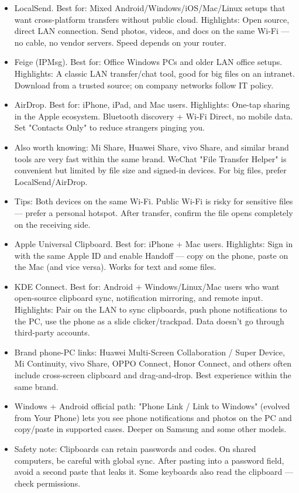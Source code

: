 
\begin{itemize}
  \item LocalSend. Best for: Mixed Android/Windows/iOS/Mac/Linux setups that want cross-platform transfers without public cloud. Highlights: Open source, direct LAN connection. Send photos, videos, and docs on the same Wi-Fi — no cable, no vendor servers. Speed depends on your router.
  \item Feige (IPMsg). Best for: Office Windows PCs and older LAN office setups. Highlights: A classic LAN transfer/chat tool, good for big files on an intranet. Download from a trusted source; on company networks follow IT policy.
  \item AirDrop. Best for: iPhone, iPad, and Mac users. Highlights: One-tap sharing in the Apple ecosystem. Bluetooth discovery + Wi-Fi Direct, no mobile data. Set "Contacts Only" to reduce strangers pinging you.
  \item Also worth knowing: Mi Share, Huawei Share, vivo Share, and similar brand tools are very fast within the same brand. WeChat "File Transfer Helper" is convenient but limited by file size and signed-in devices. For big files, prefer LocalSend/AirDrop.
  \item Tips: Both devices on the same Wi-Fi. Public Wi-Fi is risky for sensitive files — prefer a personal hotspot. After transfer, confirm the file opens completely on the receiving side.
\end{itemize}


\begin{itemize}
  \item Apple Universal Clipboard. Best for: iPhone + Mac users. Highlights: Sign in with the same Apple ID and enable Handoff — copy on the phone, paste on the Mac (and vice versa). Works for text and some files.
  \item KDE Connect. Best for: Android + Windows/Linux/Mac users who want open-source clipboard sync, notification mirroring, and remote input. Highlights: Pair on the LAN to sync clipboards, push phone notifications to the PC, use the phone as a slide clicker/trackpad. Data doesn't go through third-party accounts.
  \item Brand phone-PC links: Huawei Multi-Screen Collaboration / Super Device, Mi Continuity, vivo Share, OPPO Connect, Honor Connect, and others often include cross-screen clipboard and drag-and-drop. Best experience within the same brand.
  \item Windows + Android official path: "Phone Link / Link to Windows" (evolved from Your Phone) lets you see phone notifications and photos on the PC and copy/paste in supported cases. Deeper on Samsung and some other models.
  \item Safety note: Clipboards can retain passwords and codes. On shared computers, be careful with global sync. After pasting into a password field, avoid a second paste that leaks it. Some keyboards also read the clipboard — check permissions.
\end{itemize}

